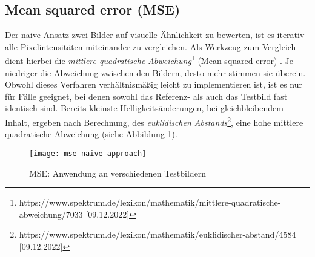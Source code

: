 \subsection{Mean squared error (MSE)}
Der naive Ansatz zwei Bilder auf visuelle Ähnlichkeit zu bewerten, ist es
iterativ alle Pixelintensitäten miteinander zu vergleichen. Als Werkzeug zum
Vergleich dient hierbei die \textit{mittlere quadratische Abweichung}\footnote{https://www.spektrum.de/lexikon/mathematik/mittlere-quadratische-abweichung/7033 [09.12.2022]}
(Mean squared error) \parencite{mse-overview}. Je niedriger die Abweichung
zwischen den Bildern, desto mehr stimmen sie überein. Obwohl dieses Verfahren 
verhältnismäßig leicht zu implementieren ist, ist es nur für Fälle geeignet,
bei denen sowohl das Referenz- als auch das Testbild fast identisch sind.
Bereits  kleinste Helligkeitsänderungen, bei gleichbleibendem Inhalt, ergeben
nach Berechnung, des \textit{euklidischen Abstands}\footnote{https://www.spektrum.de/lexikon/mathematik/euklidischer-abstand/4584 [09.12.2022]},
eine hohe mittlere quadratische Abweichung (siehe Abbildung
\ref{fig:mse-naive}). \parencite{mse-naive-approach}

\begin{figure}[H]
    \centering
    \texttt{[image: mse-naive-approach]}
    \caption{MSE: Anwendung an verschiedenen Testbildern}
    \label{fig:mse-naive}
\end{figure}